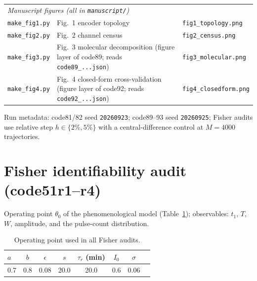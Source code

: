 \documentclass[11pt]{article}
\begin{document}
\begin{longtable}{p{4.6cm} p{6.6cm} p{4.6cm}}
\multicolumn{3}{l}{\emph{Manuscript figures (all in \texttt{manuscript/})}}\\
\texttt{make\_\allowbreak{}fig1.py} & Fig.~1 encoder topology & \texttt{fig1\_\allowbreak{}topology.png} \\
\texttt{make\_\allowbreak{}fig2.py} & Fig.~2 channel census & \texttt{fig2\_\allowbreak{}census.png} \\
\texttt{make\_\allowbreak{}fig3.py} & Fig.~3 molecular decomposition (figure layer of code89; reads \texttt{code89\_\allowbreak{}...json}) & \texttt{fig3\_\allowbreak{}molecular.png} \\
\texttt{make\_\allowbreak{}fig4.py} & Fig.~4 closed-form cross-validation (figure layer of code92; reads \texttt{code92\_\allowbreak{}...json}) & \texttt{fig4\_\allowbreak{}closedform.png} \\
\bottomrule
\end{longtable}

Run metadata: code81/82 seed \texttt{20260923}; code89--93 seed
\texttt{20260925}; Fisher audits use relative step $h\in\{2\%,5\%\}$ with a
central-difference control at $M{=}4000$ trajectories.

\section{Fisher identifiability audit (code51r1--r4)}
\label{sec:fisher}

Operating point $\theta_0$ of the phenomenological model
(Table~\ref{tab:theta0}); observables: $t_1$, $T$, $W$, amplitude, and the
pulse-count distribution.

\begin{table}[h]
\centering\small
\caption{Operating point used in all Fisher audits.}
\label{tab:theta0}
\begin{tabular}{lccccccc}
\toprule
$a$ & $b$ & $\epsilon$ & $s$ & $\tau_r$ (min) & $I_0$ & $\sigma$ \\
\midrule
0.7 & 0.8 & 0.08 & 20.0 & 20.0 & 0.6 & 0.06 \\
\bottomrule
\end{tabular}
\end{table}
\end{document}
